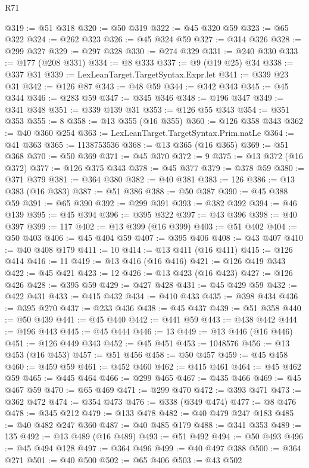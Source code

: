 \begin{lexlean}{R71}
\begin{coremodule}
@319 := @51 @318
@320 := @50 @319
@322 := @45 @320 @59
@323 := @65 @322
@324 := @262 @323
@326 := @45 @324 @59
@327 := @314 @326
@328 := @299 @327
@329 := @297 @328
@330 := @274 @329
@331 := @240 @330
@333 := @177 (@208 @331)
@334 := @8 @333
@337 := @9 (@19 @25) @34
@338 := @337 @31
@339 := LexLeanTarget.TargetSyntax.Expr.let
@341 := @339 @23 @31
@342 := @126 @87
@343 := @48 @59
@344 := @342 @343
@345 := @45 @344
@346 := @283 @59
@347 := @345 @346
@348 := @196 @347
@349 := @341 @348
@351 := @339 @139 @31
@353 := @126 @55 @343
@354 := @351 @353
@355 := 8
@358 := @13 @355 (@16 @355)
@360 := @126 @358 @343
@362 := @40 @360 @254
@363 := LexLeanTarget.TargetSyntax.Prim.natLe
@364 := @41 @363
@365 := 1138753536
@368 := @13 @365 (@16 @365)
@369 := @51 @368
@370 := @50 @369
@371 := @45 @370
@372 := 9
@375 := @13 @372 (@16 @372)
@377 := @126 @375 @343
@378 := @45 @377
@379 := @378 @59
@380 := @371 @379
@381 := @364 @380
@382 := @40 @381
@383 := 126
@386 := @13 @383 (@16 @383)
@387 := @51 @386
@388 := @50 @387
@390 := @45 @388 @59
@391 := @65 @390
@392 := @299 @391
@393 := @382 @392
@394 := @46 @139
@395 := @45 @394
@396 := @395 @322
@397 := @43 @396
@398 := @40 @397
@399 := 117
@402 := @13 @399 (@16 @399)
@403 := @51 @402
@404 := @50 @403
@406 := @45 @404 @59
@407 := @395 @406
@408 := @43 @407
@410 := @40 @408 @179
@411 := 10
@414 := @13 @411 (@16 @411)
@415 := @126 @414
@416 := 11
@419 := @13 @416 (@16 @416)
@421 := @126 @419 @343
@422 := @45 @421
@423 := 12
@426 := @13 @423 (@16 @423)
@427 := @126 @426
@428 := @395 @59
@429 := @427 @428
@431 := @45 @429 @59
@432 := @422 @431
@433 := @415 @432
@434 := @410 @433
@435 := @398 @434
@436 := @395 @270
@437 := @233 @436
@438 := @45 @437
@439 := @51 @358
@440 := @50 @439
@441 := @45 @440
@442 := @441 @59
@443 := @438 @442
@444 := @196 @443
@445 := @45 @444
@446 := 13
@449 := @13 @446 (@16 @446)
@451 := @126 @449 @343
@452 := @45 @451
@453 := 1048576
@456 := @13 @453 (@16 @453)
@457 := @51 @456
@458 := @50 @457
@459 := @45 @458
@460 := @459 @59
@461 := @452 @460
@462 := @415 @461
@464 := @45 @462 @59
@465 := @445 @464
@466 := @299 @465
@467 := @435 @466
@469 := @45 @467 @59
@470 := @65 @469
@471 := @299 @470
@472 := @393 @471
@473 := @362 @472
@474 := @354 @473
@476 := @338 (@349 @474)
@477 := @8 @476
@478 := @345 @212
@479 := @133 @478
@482 := @40 @479 @247 @183
@485 := @40 @482 @247 @360
@487 := @40 @485 @179
@488 := @341 @353
@489 := 135
@492 := @13 @489 (@16 @489)
@493 := @51 @492
@494 := @50 @493
@496 := @45 @494 @128
@497 := @364 @496
@499 := @40 @497 @388
@500 := @364 @271
@501 := @40 @500
@502 := @65 @406
@503 := @43 @502

\end{coremodule}
\end{lexlean}
